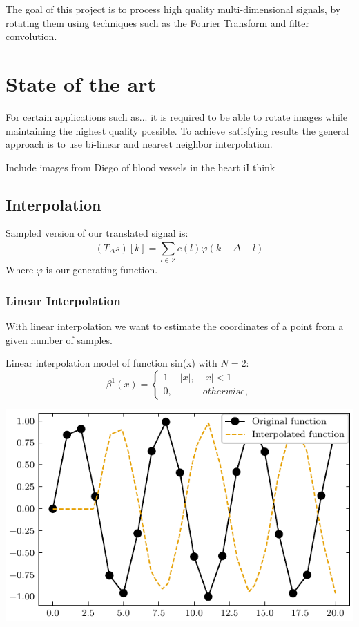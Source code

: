 \documentclass[]{usiinfbachelorproject}
\begin{document}
	The goal of this project is to process high quality multi-dimensional signals, by rotating them using techniques such as the Fourier Transform and filter convolution.
	
	
	
	
	\section{State of the art}
	For certain applications such as... it is required to be able to rotate images while maintaining the highest quality possible. To achieve satisfying results the general approach is to use bi-linear and nearest neighbor interpolation.
	
	
	Include images from Diego of blood vessels in the heart iI think
	
	
	\iffalse
	
	\subsection{Interpolation}
	Sampled version of our translated signal is:
	\begin{equation}
		(T_\Delta s)[k] = \sum_{l \in Z}^{} c(l)\varphi(k - \Delta - l)
	\end{equation}
	Where $\varphi$ is our generating function.
	\subsubsection{Linear Interpolation}
	With linear interpolation we want to estimate the coordinates of a point from a given number of samples. 
	
	Linear interpolation model of function sin(x) with $N = 2$:
	\begin{equation}
		\beta^1(x) = 
		\begin{cases}
			1 - |x|, & |x| < 1    \\
			0,       & otherwise, 
		\end{cases}
	\end{equation}
	\begin{center}
		\includegraphics{"images/linear_interpolation_example.pdf"}
	\end{center}
	
\end{document}

